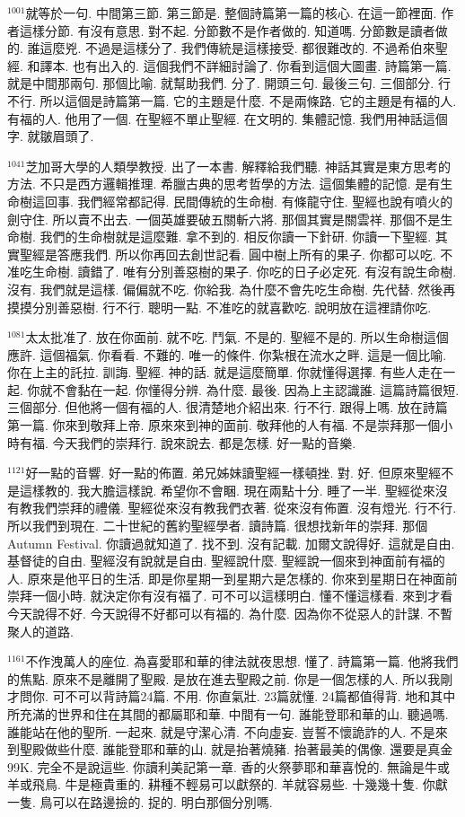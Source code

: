 \documentclass{book}
\begin{document}
$^{1001}$就等於一句.
中間第三節.
第三節是.
整個詩篇第一篇的核心.
在這一節裡面.
作者這樣分節.
有沒有意思.
對不起.
分節數不是作者做的.
知道嗎.
分節數是讀者做的.
誰這麼兇.
不過是這樣分了.
我們傳統是這樣接受.
都很難改的.
不過希伯來聖經.
和譯本.
也有出入的.
這個我們不詳細討論了.
你看到這個大圖畫.
詩篇第一篇.
就是中間那兩句.
那個比喻.
就幫助我們.
分了.
開頭三句.
最後三句.
三個部分.
行不行.
所以這個是詩篇第一篇.
它的主題是什麼.
不是兩條路.
它的主題是有福的人.
有福的人.
他用了一個.
在聖經不單止聖經.
在文明的.
集體記憶.
我們用神話這個字.
就皺眉頭了.

$^{1041}$芝加哥大學的人類學教授.
出了一本書.
解釋給我們聽.
神話其實是東方思考的方法.
不只是西方邏輯推理.
希臘古典的思考哲學的方法.
這個集體的記憶.
是有生命樹這回事.
我們經常都記得.
民間傳統的生命樹.
有條龍守住.
聖經也說有噴火的劍守住.
所以賣不出去.
一個英雄要破五關斬六將.
那個其實是關雲祥.
那個不是生命樹.
我們的生命樹就是這麼難.
拿不到的.
相反你讀一下針研.
你讀一下聖經.
其實聖經是答應我們.
所以你再回去創世記看.
圓中樹上所有的果子.
你都可以吃.
不准吃生命樹.
讀錯了.
唯有分別善惡樹的果子.
你吃的日子必定死.
有沒有說生命樹.
沒有.
我們就是這樣.
偏偏就不吃.
你給我.
為什麼不會先吃生命樹.
先代替.
然後再摸摸分別善惡樹.
行不行.
聰明一點.
不准吃的就喜歡吃.
說明放在這裡請你吃.

$^{1081}$太太批准了.
放在你面前.
就不吃.
鬥氣.
不是的.
聖經不是的.
所以生命樹這個應許.
這個福氣.
你看看.
不難的.
唯一的條件.
你紮根在流水之畔.
這是一個比喻.
你在上主的託拉.
訓誨.
聖經.
神的話.
就是這麼簡單.
你就懂得選擇.
有些人走在一起.
你就不會黏在一起.
你懂得分辨.
為什麼.
最後.
因為上主認識誰.
這篇詩篇很短.
三個部分.
但他將一個有福的人.
很清楚地介紹出來.
行不行.
跟得上嗎.
放在詩篇第一篇.
你來到敬拜上帝.
原來來到神的面前.
敬拜他的人有福.
不是崇拜那一個小時有福.
今天我們的崇拜行.
說來說去.
都是怎樣.
好一點的音樂.

$^{1121}$好一點的音響.
好一點的佈置.
弟兄姊妹讀聖經一樣頓挫.
對.
好.
但原來聖經不是這樣教的.
我大膽這樣說.
希望你不會睏.
現在兩點十分.
睡了一半.
聖經從來沒有教我們崇拜的禮儀.
聖經從來沒有教我們衣著.
從來沒有佈置.
沒有燈光.
行不行.
所以我們到現在.
二十世紀的舊約聖經學者.
讀詩篇.
很想找新年的崇拜.
那個Autumn Festival.
你讀過就知道了.
找不到.
沒有記載.
加爾文說得好.
這就是自由.
基督徒的自由.
聖經沒有說就是自由.
聖經說什麼.
聖經說一個來到神面前有福的人.
原來是他平日的生活.
即是你星期一到星期六是怎樣的.
你來到星期日在神面前崇拜一個小時.
就決定你有沒有福了.
可不可以這樣明白.
懂不懂這樣看.
來到才看今天說得不好.
今天說得不好都可以有福的.
為什麼.
因為你不從惡人的計謀.
不暫聚人的道路.

$^{1161}$不作洩萬人的座位.
為喜愛耶和華的律法就夜思想.
懂了.
詩篇第一篇.
他將我們的焦點.
原來不是離開了聖殿.
是放在進去聖殿之前.
你是一個怎樣的人.
所以我剛才問你.
可不可以背詩篇24篇.
不用.
你直氣壯.
23篇就懂.
24篇都值得背.
地和其中所充滿的世界和住在其間的都屬耶和華.
中間有一句.
誰能登耶和華的山.
聽過嗎.
誰能站在他的聖所.
一起來.
就是守潔心清.
不向虛妄.
豈誓不懷詭詐的人.
不是來到聖殿做些什麼.
誰能登耶和華的山.
就是抬著燒豬.
抬著最美的偶像.
還要是真金99K.
完全不是說這些.
你讀利美記第一章.
香的火祭夢耶和華喜悅的.
無論是牛或羊或飛鳥.
牛是極貴重的.
耕種不輕易可以獻祭的.
羊就容易些.
十幾幾十隻.
你獻一隻.
鳥可以在路邊撿的.
捉的.
明白那個分別嗎.
\end{document}
